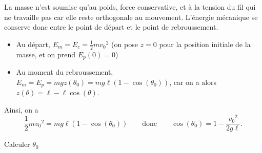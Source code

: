 
\begin{corrige}
La masse n'est soumise qu'au poids, force conservative, et à la tension du fil qui ne travaille pas car elle reste orthogonale au mouvement. L'énergie mécanique se conserve donc entre le point de départ et le point de rebroussement.
\begin{itemize}
\item Au départ, $E_m = E_c = \frac{1}{2}m{v_0}^2$ (on pose $z=0$ pour la position initiale de la masse, et on prend $E_p(0)=0$)

\item Au moment du rebroussement, $E_m = E_p = mgz(\theta_0) =  mg\ell(1-\cos(\theta_0))$, car on a alors $z(\theta)=\ell-\ell\cos(\theta)$.
\end{itemize}

Ainsi, on a 
\[
\frac{1}{2}m{v_0}^2 = mg\ell(1-\cos(\theta_0)) \qquad\text{donc}\qquad \cos(\theta_0) = 1-\frac{{v_0}^2}{2g\ell}.
\]
\end{corrige}




\begin{enonce}
Calculer $\theta_0$
\end{enonce}



\finEntrainement


\newpage







\hauteurLargeurCadreReponse		{8mm}{5cm}
\initialisationEntrainement

